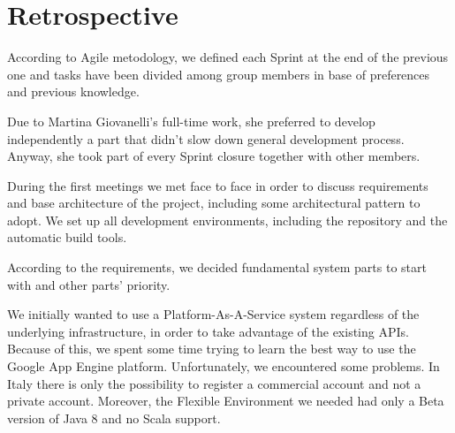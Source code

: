 \documentclass[a4paper,12pt]{report}
\begin{document}

\chapter{Retrospective}





According to Agile metodology, we defined each Sprint at the end of the previous one and tasks have been divided among group members in base of preferences and previous knowledge.

Due to Martina Giovanelli's full-time work, she preferred to develop independently a part that didn't slow down general development process. Anyway, she took part of every Sprint closure together with other members.

During the first meetings we met face to face in order to discuss requirements and base architecture of the project, including some architectural pattern to adopt.
We set up all development environments, including the repository and the automatic build tools.

According to the requirements, we decided fundamental system parts to start with and other parts' priority.

We initially wanted to use a Platform-As-A-Service system regardless of the underlying infrastructure, in order to take advantage of the existing APIs. Because of this, we spent some time trying to learn the best way to use the Google App Engine platform.
Unfortunately, we encountered some problems. In Italy there is only the possibility to register a commercial account and not a private account. Moreover, the Flexible Environment we needed had only a Beta version of Java 8 and no Scala support.
\end{document}
